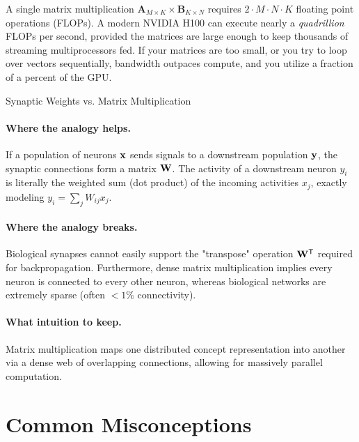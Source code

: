 A single matrix multiplication $\mathbf{A}_{M \times K} \times \mathbf{B}_{K \times N}$ requires $2 \cdot M \cdot N \cdot K$ floating point operations (FLOPs). A modern NVIDIA H100 can execute nearly a \textit{quadrillion} FLOPs per second, provided the matrices are large enough to keep thousands of streaming multiprocessors fed. If your matrices are too small, or you try to loop over vectors sequentially, bandwidth outpaces compute, and you utilize a fraction of a percent of the GPU.

\begin{analogybox}{Synaptic Weights vs. Matrix Multiplication}
  \paragraph{Where the analogy helps.}
  If a population of neurons $\mathbf{x}$ sends signals to a downstream population $\mathbf{y}$, the synaptic connections form a matrix $\mathbf{W}$. The activity of a downstream neuron $y_i$ is literally the weighted sum (dot product) of the incoming activities $x_j$, exactly modeling $y_i = \sum_j W_{ij} x_j$.

  \paragraph{Where the analogy breaks.}
  Biological synapses cannot easily support the "transpose" operation $\mathbf{W}^{\mathsf{T}}$ required for backpropagation. Furthermore, dense matrix multiplication implies every neuron is connected to every other neuron, whereas biological networks are extremely sparse (often $<1\%$ connectivity).

  \paragraph{What intuition to keep.}
  Matrix multiplication maps one distributed concept representation into another via a dense web of overlapping connections, allowing for massively parallel computation.
\end{analogybox}


\section{Common Misconceptions}
\label{ch:02:sec:misconceptions}

